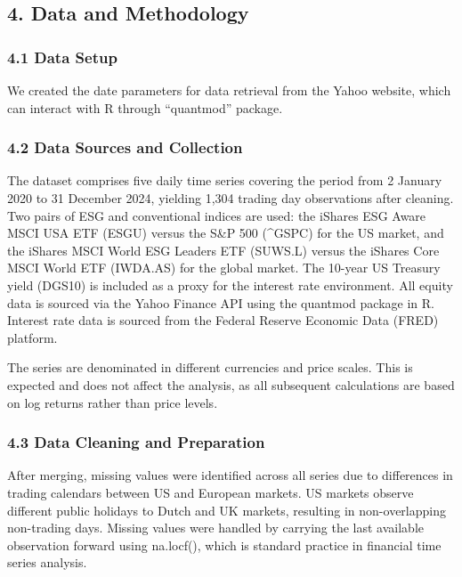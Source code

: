 \documentclass[
]{article}
\begin{document}
\subsection{4. Data and Methodology}\label{data-and-methodology}

\subsubsection{4.1 Data Setup}\label{data-setup}

We created the date parameters for data retrieval from the Yahoo
website, which can interact with R through ``quantmod'' package.

\subsubsection{4.2 Data Sources and
Collection}\label{data-sources-and-collection}

The dataset comprises five daily time series covering the period from 2
January 2020 to 31 December 2024, yielding 1,304 trading day
observations after cleaning. Two pairs of ESG and conventional indices
are used: the iShares ESG Aware MSCI USA ETF (ESGU) versus the S\&P 500
(\^{}GSPC) for the US market, and the iShares MSCI World ESG Leaders ETF
(SUWS.L) versus the iShares Core MSCI World ETF (IWDA.AS) for the global
market. The 10-year US Treasury yield (DGS10) is included as a proxy for
the interest rate environment. All equity data is sourced via the Yahoo
Finance API using the quantmod package in R. Interest rate data is
sourced from the Federal Reserve Economic Data (FRED) platform.

The series are denominated in different currencies and price scales.
This is expected and does not affect the analysis, as all subsequent
calculations are based on log returns rather than price levels.

\subsubsection{4.3 Data Cleaning and
Preparation}\label{data-cleaning-and-preparation}

After merging, missing values were identified across all series due to
differences in trading calendars between US and European markets. US
markets observe different public holidays to Dutch and UK markets,
resulting in non-overlapping non-trading days. Missing values were
handled by carrying the last available observation forward using
na.locf(), which is standard practice in financial time series analysis.
\end{document}

